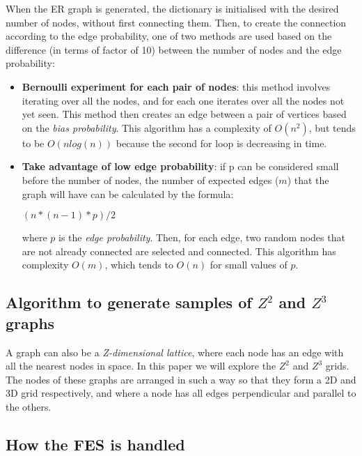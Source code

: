\documentclass[conference]{IEEEtran}
\begin{document}
    When the ER graph is generated, the dictionary is initialised with the desired number of nodes, without first connecting them. 
    Then, to create the connection according to the edge probability, one of two methods are used based on the difference (in terms of factor of 10) between the number of nodes and the edge probability:
    \begin{itemize}
        \item \textbf{Bernoulli experiment for each pair of nodes}: this method involves iterating over all the nodes, and for each one iterates over all the nodes not yet seen. 
        This method then creates an edge between a pair of vertices based on the \textit{bias probability}.
        This algorithm has a complexity of $O(n^2)$, but tends to be $O(nlog(n))$ because the second for loop is decreasing in time.

        \item \textbf{Take advantage of low edge probability}: if p can be considered small before the number of nodes, the number of expected edges ($m$) that the graph will have can be calculated by the formula:
        \begin{center}
            \begin{math}
                  (n*(n-1)*p)/2 
            \end{math}            
        \end{center}        
        where $p$ is the \textit{edge probability}. 
        Then, for each edge, two random nodes that are not already connected are selected and connected.
        This algorithm has complexity $O(m)$, which tends to $O(n)$ for small values of $p$.
    \end{itemize}

    \subsection{Algorithm to generate samples of $Z^2$ and $Z^3$ graphs}

    A graph can also be a \textit{Z-dimensional lattice}, where each node has an edge with all the nearest nodes in space. 
    In this paper we will explore the $Z^2$ and $Z^3$ grids. The nodes of these graphs are arranged in such a way so that they form a 2D and 3D grid respectively, and where a node has all edges perpendicular and parallel to the others.


    \subsection{How the FES is handled}
\end{document}

